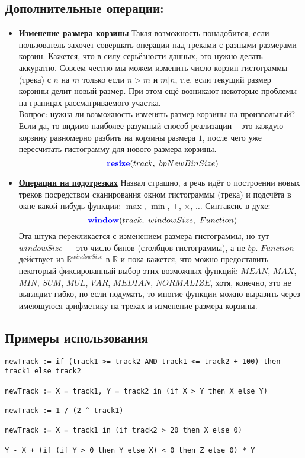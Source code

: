 \subsection*{Дополнительные операции:}
\begin{itemize}
	\item \textbf{\underline{Изменение размера корзины}} Такая возможность понадобится, если пользователь захочет совершать операции над треками с разными размерами корзин. Кажется, что в силу серьёзности данных, это нужно делать аккуратно. Совсем честно мы можем изменить число корзин гистограммы (трека) с $n$ на $m$ только если $n > m$ и $m | n$, т.е. если текущий размер корзины делит новый размер. При этом ещё возникают некоторые проблемы на границах рассматриваемого участка.\\
	Вопрос: нужна ли возможность изменять размер корзины на произвольный? Если да, то видимо наиболее разумный способ реализации -- это каждую корзину равномерно разбить на корзины размера $1$, после чего уже пересчитать гистограмму для нового размера корзины.
	\[
		\kw { resize}(track,\ bpNewBinSize) 
	\]
	\item \textbf{\underline{Операции на подотрезках}} Назвал страшно, а речь идёт о построении новых треков посредством сканирования окном гистограммы (трека) и подсчёта в окне какой-нибудь функции: $\max$, $\min$, $+$, $\times$, $\ldots$ Синтаксис в духе:
	\[
		\kw { window}(track,\ windowSize,\ Function) 
	\]
	Эта штука перекликается с изменением размера гистограммы, но тут $windowSize$ --- это число бинов (столбцов гистограммы), а не $bp$.
	$Function$ действует из $\mathbb{R}^{windowSize}$ в $\mathbb{R}$ и пока кажется, что можно предоставить некоторый фиксированный выбор этих возможных функций: $MEAN$, $MAX$, $MIN$, $SUM$, $MUL$, $VAR$, $MEDIAN$, $NORMALIZE$, хотя, конечно, это не выглядит гибко, но если подумать, то многие функции можно выразить через имеющуюся арифметику на треках и изменение размера корзины.
\end{itemize}

\subsection*{Примеры использования}
\begin{lstlisting}
newTrack := if (track1 >= track2 AND track1 <= track2 + 100) then track1 else track2

newTrack := X = track1, Y = track2 in (if X > Y then X else Y)

newTrack := 1 / (2 ^ track1)

newTrack := X = track1 in (if track2 > 20 then X else 0)

Y - X + (if (if Y > 0 then Y else X) < 0 then Z else 0) * Y
\end{lstlisting}

